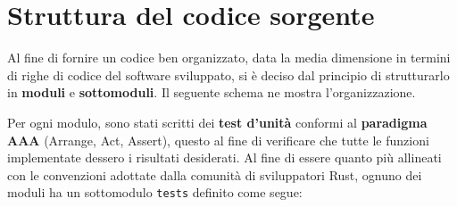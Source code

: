 \section{Struttura del codice sorgente}\label{sec:Struttura_Codice}
Al fine di fornire un codice ben organizzato, data la media dimensione in termini di righe di codice del software sviluppato, si è deciso dal principio di strutturarlo in \textbf{moduli} e \textbf{sottomoduli}. Il seguente schema ne mostra l'organizzazione.\\
{
\large{
}
}

\vspace{0.5em}
\noindent
Per ogni modulo, sono stati scritti dei \textbf{test d'unità} conformi al \textbf{paradigma AAA} (Arrange, Act, Assert), questo al fine di verificare che tutte le funzioni implementate dessero i risultati desiderati. Al fine di essere quanto più allineati con le convenzioni adottate dalla comunità di sviluppatori Rust, ognuno dei moduli ha un sottomodulo \texttt{tests} definito come segue: 

